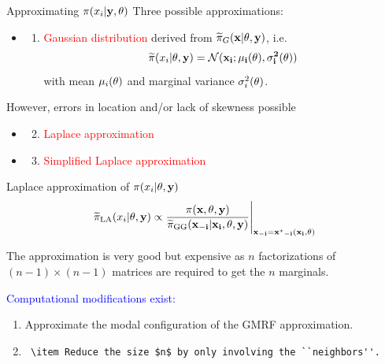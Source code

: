 \documentclass[
  ignorenonframetext,
]{beamer}
\providecommand{\tightlist}{%
  \setlength{\itemsep}{0pt}\setlength{\parskip}{0pt}}
\begin{document}
\begin{frame}{Approximating \(\pi(x_i|\bf{y}, \bf{\theta})\)}
\protect\hypertarget{approximating-pix_ibfy-bftheta}{}
Three possible approximations:

\begin{itemize}[<+->]
\item
  \begin{enumerate}[<+->]
  \tightlist
  \item
    \textcolor{red}{Gaussian distribution} derived from
    \(\widetilde{\pi}_G(\bf{x}|\bf{\theta}, \bf{y})\), i.e. \[
    \widetilde{\pi}(x_i|\bf{\theta}, \bf{y}) = \mathcal{N}(x_i; \mu_i(\bf{\theta}), \sigma_i^2(\bf{\theta}))
    \] with mean \(\mu_i(\bf{\theta})\) and marginal variance
    \(\sigma_i^2(\bf{\theta})\).
  \end{enumerate}
\end{itemize}

However, errors in location and/or lack of skewness possible

\begin{itemize}[<+->]
\item
  \begin{enumerate}[<+->]
  \setcounter{enumi}{1}
  \tightlist
  \item
    \textcolor{red}{Laplace approximation}
  \end{enumerate}
\item
  \begin{enumerate}[<+->]
  \setcounter{enumi}{2}
  \tightlist
  \item
    \textcolor{red}{Simplified Laplace approximation}
  \end{enumerate}
\end{itemize}
\end{frame}

\begin{frame}[fragile]{Laplace approximation of
\(\pi(x_i|\bf{\theta}, \bf{y})\)}
\protect\hypertarget{laplace-approximation-of-pix_ibftheta-bfy}{}
\[
\widetilde{\pi}_\text{LA}(x_i|\bf{\theta}, \bf{y}) \propto
            \frac{\pi(\bf{x}, \bf{\theta},\bf{y})}
            {\widetilde{\pi}_\text{GG}(\bf{x}_{-i}|x_i, \bf{\theta}, \bf{y})}
            \Biggr|_{\bf{x}_{-i}=\bf{x^\star}_{-i}(x_i, \bf{\theta})}
\]

The approximation is very good but expensive as \(n\) factorizations of
\((n-1) \times (n-1)\) matrices are required to get the \(n\) marginals.

\pause

\textcolor{blue}{Computational modifications exist:}

\begin{enumerate}
\item
  Approximate the modal configuration of the GMRF approximation.
\item
\begin{verbatim}
 \item Reduce the size $n$ by only involving the ``neighbors''.
\end{verbatim}
\end{enumerate}
\end{frame}
\end{document}
